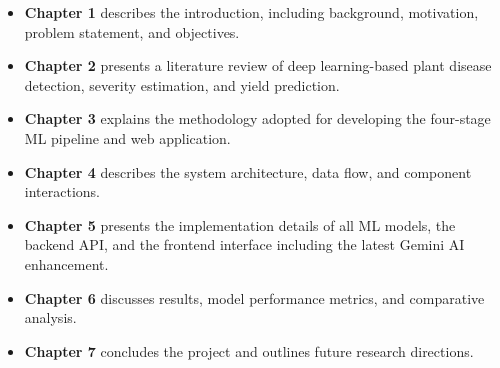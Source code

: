 \begin{itemize}
    \item \textbf{Chapter 1} describes the introduction, including background, motivation, problem statement, and objectives.
    \item \textbf{Chapter 2} presents a literature review of deep learning-based plant disease detection, severity estimation, and yield prediction.
    \item \textbf{Chapter 3} explains the methodology adopted for developing the four-stage ML pipeline and web application.
    \item \textbf{Chapter 4} describes the system architecture, data flow, and component interactions.
    \item \textbf{Chapter 5} presents the implementation details of all ML models, the backend API, and the frontend interface including the latest Gemini AI enhancement.
    \item \textbf{Chapter 6} discusses results, model performance metrics, and comparative analysis.
    \item \textbf{Chapter 7} concludes the project and outlines future research directions.
\end{itemize}

